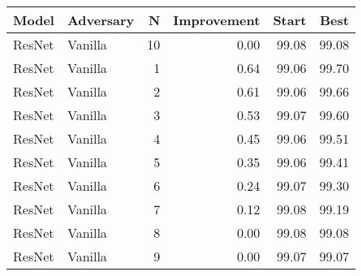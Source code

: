 \begin{tabular}{llrrrr}
\toprule
  Model & Adversary &   N &  Improvement &  Start &   Best \\
\midrule
 ResNet &   Vanilla &  10 &         0.00 &  99.08 &  99.08 \\
 ResNet &   Vanilla &   1 &         0.64 &  99.06 &  99.70 \\
 ResNet &   Vanilla &   2 &         0.61 &  99.06 &  99.66 \\
 ResNet &   Vanilla &   3 &         0.53 &  99.07 &  99.60 \\
 ResNet &   Vanilla &   4 &         0.45 &  99.06 &  99.51 \\
 ResNet &   Vanilla &   5 &         0.35 &  99.06 &  99.41 \\
 ResNet &   Vanilla &   6 &         0.24 &  99.07 &  99.30 \\
 ResNet &   Vanilla &   7 &         0.12 &  99.08 &  99.19 \\
 ResNet &   Vanilla &   8 &         0.00 &  99.08 &  99.08 \\
 ResNet &   Vanilla &   9 &         0.00 &  99.07 &  99.07 \\
\bottomrule
\end{tabular}
